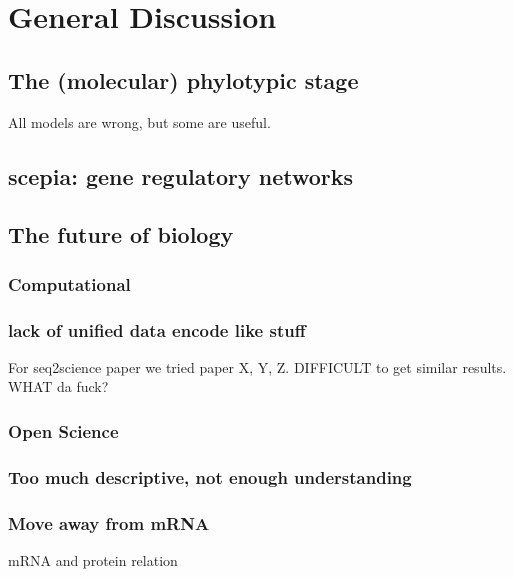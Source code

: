 \chapter{General Discussion}\thumbforchapter
\newpage

\section{The (molecular) phylotypic stage}

All models are wrong, but some are useful. 

\section{scepia: gene regulatory networks}

\section{The future of biology}

\subsection{Computational}

\subsection{lack of unified data encode like stuff}

For seq2science paper we tried paper X, Y, Z. DIFFICULT to get similar results. WHAT da fuck?

% 

\subsection{Open Science}

\subsection{Too much descriptive, not enough understanding}

\subsection{Move away from mRNA}

mRNA and protein relation

